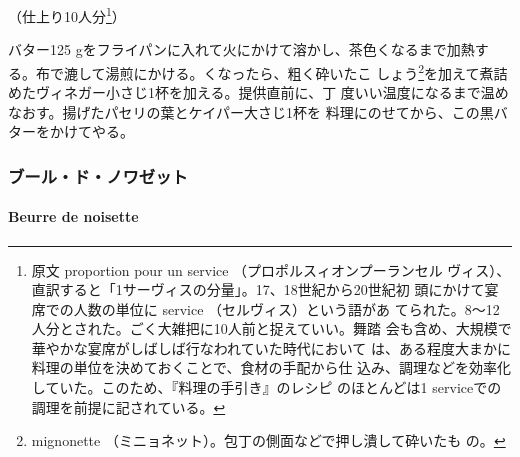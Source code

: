 \begin{recette}

（仕上り10人分\footnote{原文 proportion pour un service
  （プロポルスィオンプーランセル
  ヴィス）、直訳すると「1サーヴィスの分量」。17、18世紀から20世紀初
  頭にかけて宴席での人数の単位に service （セルヴィス）という語があ
  てられた。8〜12人分とされた。ごく大雑把に10人前と捉えていい。舞踏
  会も含め、大規模で華やかな宴席がしばしば行なわれていた時代において
  は、ある程度大まかに料理の単位を決めておくことで、食材の手配から仕
  込み、調理などを効率化していた。このため、『料理の手引き』のレシピ
  のほとんどは1 serviceでの調理を前提に記されている。}）

バター125 gをフライパンに入れて火にかけて溶かし、茶色くなるまで加熱す
る。布で漉して湯煎にかける。くなったら、粗く砕いたこ
しょう\footnote{mignonette
  （ミニョネット）。包丁の側面などで押し潰して砕いたも の。}を加えて煮詰めたヴィネガー小さじ1杯を加える。提供直前に、丁
度いい温度になるまで温めなおす。揚げたパセリの葉とケイパー大さじ1杯を
料理にのせてから、この黒バターをかけてやる。

\maeaki

\hypertarget{ux30d6ux30fcux30ebux30c9ux30ceux30efux30bcux30c3ux30c8}{%
\subsubsection{ブール・ド・ノワゼット}\label{ux30d6ux30fcux30ebux30c9ux30ceux30efux30bcux30c3ux30c8}}

\hypertarget{beurre-de-noisette}{%
\paragraph{Beurre de noisette}\label{beurre-de-noisette}}



\end{recette}
